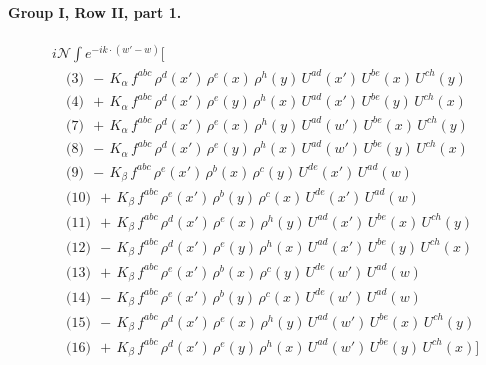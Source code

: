 \documentclass[10pt]{article}
\numberwithin{equation}{section}
\newcommand{\NN}{\mathcal N}
\begin{document}
\paragraph{Group I, Row II, part 1.}
\begin{align*}
&i\NN\int e^{-ik\cdot(w'-w)}\Big[\\
&\quad\text{(3)}\ \ -\,K_{\alpha}\,f^{abc}\,\rho^{d}(x')\,\rho^{e}(x)\,\rho^{h}(y)\,U^{ad}(x')\,U^{be}(x)\,U^{ch}(y)\\
&\quad\text{(4)}\ \ +\,K_{\alpha}\,f^{abc}\,\rho^{d}(x')\,\rho^{e}(y)\,\rho^{h}(x)\,U^{ad}(x')\,U^{be}(y)\,U^{ch}(x)\\
&\quad\text{(7)}\ \ +\,K_{\alpha}\,f^{abc}\,\rho^{d}(x')\,\rho^{e}(x)\,\rho^{h}(y)\,U^{ad}(w')\,U^{be}(x)\,U^{ch}(y)\\
&\quad\text{(8)}\ \ -\,K_{\alpha}\,f^{abc}\,\rho^{d}(x')\,\rho^{e}(y)\,\rho^{h}(x)\,U^{ad}(w')\,U^{be}(y)\,U^{ch}(x)\\
&\quad\text{(9)}\ \ -\,K_{\beta}\,f^{abc}\,\rho^{e}(x')\,\rho^{b}(x)\,\rho^{c}(y)\,U^{de}(x')\,U^{ad}(w)\\
&\quad\text{(10)}\ \ +\,K_{\beta}\,f^{abc}\,\rho^{e}(x')\,\rho^{b}(y)\,\rho^{c}(x)\,U^{de}(x')\,U^{ad}(w)\\
&\quad\text{(11)}\ \ +\,K_{\beta}\,f^{abc}\,\rho^{d}(x')\,\rho^{e}(x)\,\rho^{h}(y)\,U^{ad}(x')\,U^{be}(x)\,U^{ch}(y)\\
&\quad\text{(12)}\ \ -\,K_{\beta}\,f^{abc}\,\rho^{d}(x')\,\rho^{e}(y)\,\rho^{h}(x)\,U^{ad}(x')\,U^{be}(y)\,U^{ch}(x)\\
&\quad\text{(13)}\ \ +\,K_{\beta}\,f^{abc}\,\rho^{e}(x')\,\rho^{b}(x)\,\rho^{c}(y)\,U^{de}(w')\,U^{ad}(w)\\
&\quad\text{(14)}\ \ -\,K_{\beta}\,f^{abc}\,\rho^{e}(x')\,\rho^{b}(y)\,\rho^{c}(x)\,U^{de}(w')\,U^{ad}(w)\\
&\quad\text{(15)}\ \ -\,K_{\beta}\,f^{abc}\,\rho^{d}(x')\,\rho^{e}(x)\,\rho^{h}(y)\,U^{ad}(w')\,U^{be}(x)\,U^{ch}(y)\\
&\quad\text{(16)}\ \ +\,K_{\beta}\,f^{abc}\,\rho^{d}(x')\,\rho^{e}(y)\,\rho^{h}(x)\,U^{ad}(w')\,U^{be}(y)\,U^{ch}(x)\Big]
\end{align*}
\end{document}
